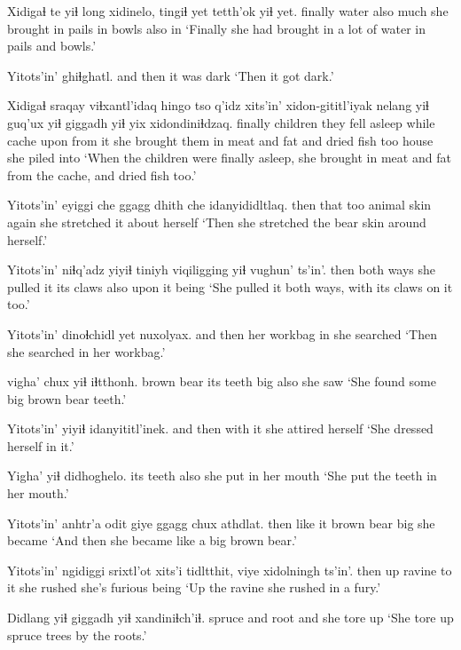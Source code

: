 \documentclass[12pt]{article}
\begin{document}
\gll Xidigaɬ te yiɬ long xidinelo, tingiɬ yet tetth'ok yiɬ yet.
finally  water also much {she brought in} pails in bowls  also in
\glt `Finally she had brought in a lot of water in pails and bowls.'
\glend 

\gll Yitots'in' ghiɬghatl.
{and then} {it was dark}
\glt `Then it got dark.'
\glend 

\gll Xidigaɬ sraqay viɬxantl'idaq hingo tso q'idz xits'in' xidon-gititl'iyak nelang yiɬ guq'ux yiɬ giggadh yiɬ yix xidondiniɬdzaq. 
finally  children {they fell asleep}  while cache upon {from it} {she brought them in } meat  and fat  and {dried fish} too house {she piled into}
\glt `When the children were finally asleep, she brought in meat and fat from the cache, and dried fish too.'
\glend 

\gll Yitots'in' eyiggi  che ggagg  dhith che idanyididltlaq.
then  that  too animal  skin again {she stretched it about herself}
\glt `Then she stretched the bear skin around herself.'
\glend 

\gll Yitots'in' niɬq'adz {yiyiɬ tiniyh} viqiligging yiɬ vughun' ts'in'.
then  {both ways} {she pulled it} {its claws} also {upon it} being 
\glt `She pulled it both ways, with its claws on it too.'
\glend 

\gll Yitots'in' dinoɬchidl yet nuxolyax.  
{and then} {her workbag} in {she searched } 
\glt `Then she searched in her workbag.'
\glend 

  vigha'  chux yiɬ iɬtthonh.
{brown bear} {its teeth} big also {she saw}
\glt `She found some big brown bear teeth.'
\glend

\gll Yitots'in' yiyiɬ idanyititl'inek.
{and then} {with it} {she attired herself}
\glt `She dressed herself in it.'
\glend 

\gll Yigha' yiɬ didhoghelo.
{its teeth} also {she put in her mouth}
\glt `She put the teeth in her mouth.'
\glend 

\gll Yitots'in' anhtr'a odit {giye ggagg} chux athdlat.
then  like  it {brown bear} big {she became}
\glt `And then she became like a big brown bear.'
\glend 

\gll Yitots'in' ngidiggi srixtl'ot xits'i tidltthit, {viye xidolningh} ts'in'.
then  up  ravine {to it} {she rushed} {she's furious} being
\glt `Up the ravine she rushed in a fury.'
\glend 

\gll Didlang yiɬ giggadh yiɬ xandiniɬch'iɬ.
spruce  and root and {she tore up}
\glt `She tore up spruce trees by the roots.'
\glend 
\end{document}
